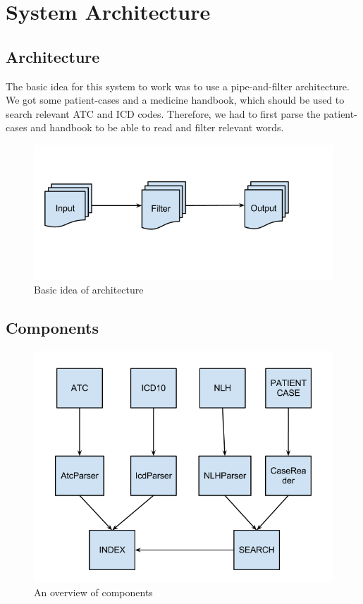 \chapter{System Architecture}
\section{Architecture}
The basic idea for this system to work was to use a pipe-and-filter architecture. We got some patient-cases and a medicine handbook, which should be used to search relevant ATC and ICD codes. Therefore, we had to first parse the patient-cases and handbook to be able to read and filter relevant words. 

\begin{figure}[h]
\centering
\includegraphics[scale=0.5]{system_architecture/architecture.png}
\caption{Basic idea of architecture}
\end{figure}

\pagebreak
\section{Components}

\begin{figure}[h]
\centering
\includegraphics[scale=0.5]{system_architecture/components.png}
\caption{An overview of components}
\end{figure}

